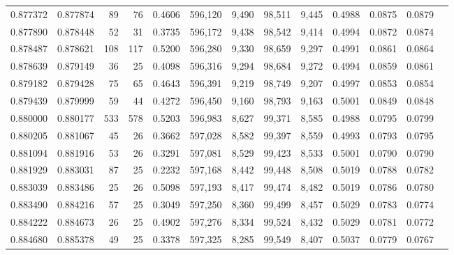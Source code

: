 \begin{tabular}{rrrrrrrrrrrrr}
0.877372 & 0.877874 &    89 &  76 &                                     0.4606 & 596,120 &   9,490 &  98,511 &   9,445 & 0.4988 & 0.0875 & 0.0879 \\
0.877890 & 0.878448 &    52 &  31 &                                     0.3735 & 596,172 &   9,438 &  98,542 &   9,414 & 0.4994 & 0.0872 & 0.0874 \\
0.878487 & 0.878621 &   108 & 117 &                                     0.5200 & 596,280 &   9,330 &  98,659 &   9,297 & 0.4991 & 0.0861 & 0.0864 \\
0.878639 & 0.879149 &    36 &  25 &                                     0.4098 & 596,316 &   9,294 &  98,684 &   9,272 & 0.4994 & 0.0859 & 0.0861 \\
0.879182 & 0.879428 &    75 &  65 &                                     0.4643 & 596,391 &   9,219 &  98,749 &   9,207 & 0.4997 & 0.0853 & 0.0854 \\
0.879439 & 0.879999 &    59 &  44 &                                     0.4272 & 596,450 &   9,160 &  98,793 &   9,163 & 0.5001 & 0.0849 & 0.0848 \\
0.880000 & 0.880177 &   533 & 578 &                                     0.5203 & 596,983 &   8,627 &  99,371 &   8,585 & 0.4988 & 0.0795 & 0.0799 \\
0.880205 & 0.881067 &    45 &  26 &                                     0.3662 & 597,028 &   8,582 &  99,397 &   8,559 & 0.4993 & 0.0793 & 0.0795 \\
0.881094 & 0.881916 &    53 &  26 &                                     0.3291 & 597,081 &   8,529 &  99,423 &   8,533 & 0.5001 & 0.0790 & 0.0790 \\
0.881929 & 0.883031 &    87 &  25 &                                     0.2232 & 597,168 &   8,442 &  99,448 &   8,508 & 0.5019 & 0.0788 & 0.0782 \\
0.883039 & 0.883486 &    25 &  26 &                                     0.5098 & 597,193 &   8,417 &  99,474 &   8,482 & 0.5019 & 0.0786 & 0.0780 \\
0.883490 & 0.884216 &    57 &  25 &                                     0.3049 & 597,250 &   8,360 &  99,499 &   8,457 & 0.5029 & 0.0783 & 0.0774 \\
0.884222 & 0.884673 &    26 &  25 &                                     0.4902 & 597,276 &   8,334 &  99,524 &   8,432 & 0.5029 & 0.0781 & 0.0772 \\
0.884680 & 0.885378 &    49 &  25 &                                     0.3378 & 597,325 &   8,285 &  99,549 &   8,407 & 0.5037 & 0.0779 & 0.0767 \\

\end{tabular}
